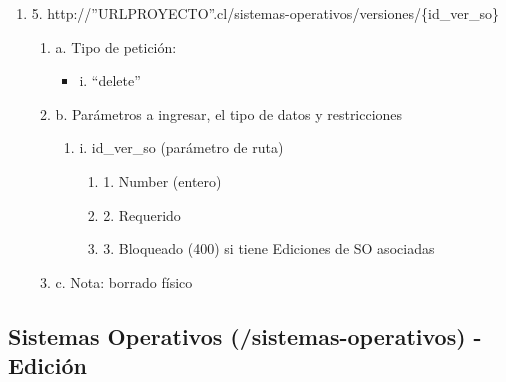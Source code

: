 \begin{enumerate}
    \item 5. http://”URLPROYECTO”.cl/sistemas-operativos/versiones/\{id\_ver\_so\}
    \begin{enumerate}
        \item a. Tipo de petición:
            \begin{itemize}
               \item i. “delete”
            \end{itemize}
        \item b. Parámetros a ingresar, el tipo de datos y restricciones
            \begin{enumerate}
                \item i. id\_ver\_so (parámetro de ruta)
                    \begin{enumerate}
                        \item 1. Number (entero)
                        \item 2. Requerido
                        \item 3. Bloqueado (400) si tiene Ediciones de SO asociadas
                    \end{enumerate}
            \end{enumerate}
        \item c. Nota: borrado físico
    \end{enumerate}
\end{enumerate}

\subsection{Sistemas Operativos (/sistemas-operativos) - Edición}

